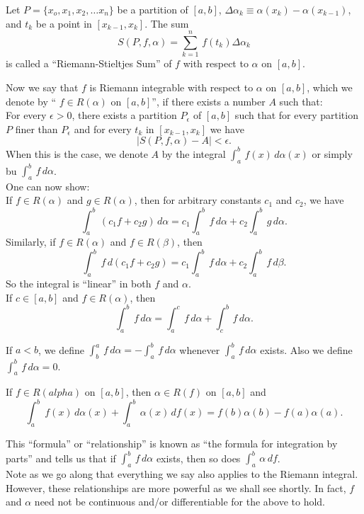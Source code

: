 \begin{definition}
Let $P= \{ x_o, x_1, x_2, \hdots x_n\}$ be a partition of $[a,b]$, $\Delta \alpha_k \equiv \alpha(x_k) - \alpha(x_{k-1})$, and $t_k$ be a point in $[x_{k-1}, x_k]$. The sum
$$S(P,f,\alpha) = \sum_{k=1}^n\, f(t_k) \Delta \alpha_k$$ is called a ``Riemann-Stieltjes Sum'' of $f$ with respect to $\alpha$ on $[a,b]$.
\end{definition}
Now we say that $f$ is Riemann integrable with respect to $\alpha$ on $[a,b]$, which we denote by `` $f\in R(\alpha)$ on $[a,b]$'', if there exists a number $A$ such that:\\
For every $\epsilon>0$, there exists a partition $P_\epsilon$ of $[a,b]$ such that for every partition $P$ finer than $P_\epsilon$ and for every $t_k$ in $[x_{k-1}, x_k]$ we have
$$\left| S(P,f,\alpha) - A\right| < \epsilon.$$
When this is the case, we denote $A$ by the integral $ \displaystyle \int_a^b\, f(x)\, d\alpha(x)$ or simply bu $\displaystyle \int_a^b \, f\, d\alpha$.\\
One can now show:\\
If $f\in R(\alpha)$ and $g\in R(\alpha)$, then for arbitrary constants $c_1$ and $c_2$, we have 
$$\int_a^b\, (c_1 f + c_2 g)\, d\alpha = c_1\int_a^b\, f\, d\alpha + c_2 \int_a^b\, g\, d\alpha.$$
Similarly, if $f\in R(\alpha)$ and $f\in R(\beta)$, then 
$$\int_a^b\, f\, d(c_1 f + c_2 g)  = c_1\int_a^b\, f\, d\alpha + c_2 \int_a^b\, f\, d\beta.$$ 
So the integral is ``linear'' in both $f$ and $\alpha$.\\
If $c \in [a,b]$ and $f\in R(\alpha)$, then 
$$\int_a^b\, f\, d\alpha = \int_a^c\, f\, d\alpha + \int_c^b\, f\, d\alpha.$$

\begin{definition}
If $a<b$, we define $\displaystyle \int_b^a \, f\, d\alpha = - \int_a^b\, f\, d\alpha$ whenever $\displaystyle \int_a^b\, f\, d\alpha$ exists. Also we define
$\displaystyle \int_a^b\, f\, d\alpha = 0$. 
\end{definition}

\begin{theorem}
If $f\in R(alpha)$ on $[a,b]$, then $\alpha \in R(f)$ on $[a,b]$ and 
$$\int_a^b \ f(x) \, d\alpha(x) + \int_a^b\, \alpha(x) \, df(x) = f(b)\alpha(b) - f(a)\alpha(a).$$
\end{theorem}

This ``formula'' or ``relationship'' is known as ``the formula for integration by parts'' and tells us that if $\displaystyle \int_a^b\, f\, d\alpha$ exists, then so does
$\displaystyle \int_a^b\, \alpha\, df$.\\
Note as we go along that everything we say also applies to the Riemann integral. However, these relationships are more powerful as we shall see shortly. In fact, 
$f$ and $\alpha$ need not be continuous and/or differentiable for the above to hold.

